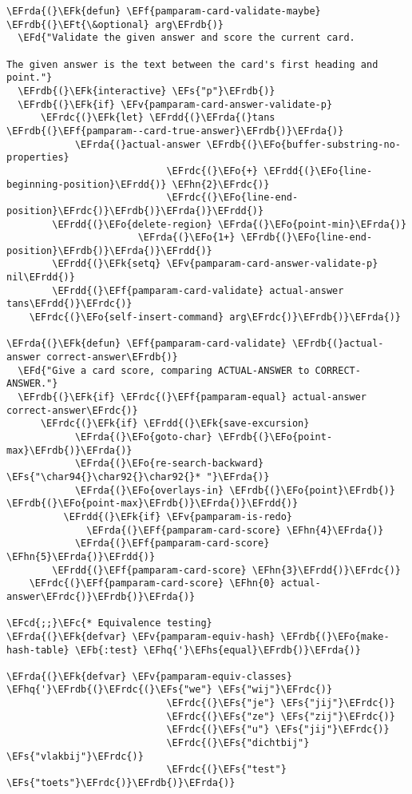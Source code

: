\documentclass[a4wide,10pt]{article}
\newcommand{\EFc}[1]{\textcolor{EFc}{#1}} %
\newcommand{\EFcd}[1]{\textcolor{EFcd}{#1}} %
\newcommand{\EFs}[1]{\textcolor{EFs}{#1}} %
\newcommand{\EFd}[1]{\textcolor{EFd}{#1}} %
\newcommand{\EFk}[1]{\textcolor{EFk}{#1}} %
\newcommand{\EFb}[1]{\textcolor{EFb}{#1}} %
\newcommand{\EFf}[1]{\textcolor{EFf}{#1}} %
\newcommand{\EFv}[1]{\textcolor{EFv}{#1}} %
\newcommand{\EFt}[1]{\textcolor{EFt}{#1}} %
\newcommand{\EFo}[1]{\textcolor{EFo}{#1}} %
\newcommand{\EFhn}[1]{\textcolor{EFhn}{\textbf{#1}}} %
\newcommand{\EFhq}[1]{\textcolor{EFhq}{#1}} %
\newcommand{\EFhs}[1]{\textcolor{EFhs}{#1}} %
\newcommand{\EFrda}[1]{\textcolor{EFrda}{#1}} %
\newcommand{\EFrdb}[1]{\textcolor{EFrdb}{#1}} %
\newcommand{\EFrdc}[1]{\textcolor{EFrdc}{#1}} %
\newcommand{\EFrdd}[1]{\textcolor{EFrdd}{#1}} %
\begin{document}
\begin{Code}
\begin{Verbatim}
\EFrda{(}\EFk{defun} \EFf{pamparam-card-validate-maybe} \EFrdb{(}\EFt{\&optional} arg\EFrdb{)}
  \EFd{"Validate the given answer and score the current card.

The given answer is the text between the card's first heading and
point."}
  \EFrdb{(}\EFk{interactive} \EFs{"p"}\EFrdb{)}
  \EFrdb{(}\EFk{if} \EFv{pamparam-card-answer-validate-p}
      \EFrdc{(}\EFk{let} \EFrdd{(}\EFrda{(}tans \EFrdb{(}\EFf{pamparam--card-true-answer}\EFrdb{)}\EFrda{)}
            \EFrda{(}actual-answer \EFrdb{(}\EFo{buffer-substring-no-properties}
                            \EFrdc{(}\EFo{+} \EFrdd{(}\EFo{line-beginning-position}\EFrdd{)} \EFhn{2}\EFrdc{)}
                            \EFrdc{(}\EFo{line-end-position}\EFrdc{)}\EFrdb{)}\EFrda{)}\EFrdd{)}
        \EFrdd{(}\EFo{delete-region} \EFrda{(}\EFo{point-min}\EFrda{)}
                       \EFrda{(}\EFo{1+} \EFrdb{(}\EFo{line-end-position}\EFrdb{)}\EFrda{)}\EFrdd{)}
        \EFrdd{(}\EFk{setq} \EFv{pamparam-card-answer-validate-p} nil\EFrdd{)}
        \EFrdd{(}\EFf{pamparam-card-validate} actual-answer tans\EFrdd{)}\EFrdc{)}
    \EFrdc{(}\EFo{self-insert-command} arg\EFrdc{)}\EFrdb{)}\EFrda{)}

\EFrda{(}\EFk{defun} \EFf{pamparam-card-validate} \EFrdb{(}actual-answer correct-answer\EFrdb{)}
  \EFd{"Give a card score, comparing ACTUAL-ANSWER to CORRECT-ANSWER."}
  \EFrdb{(}\EFk{if} \EFrdc{(}\EFf{pamparam-equal} actual-answer correct-answer\EFrdc{)}
      \EFrdc{(}\EFk{if} \EFrdd{(}\EFk{save-excursion}
            \EFrda{(}\EFo{goto-char} \EFrdb{(}\EFo{point-max}\EFrdb{)}\EFrda{)}
            \EFrda{(}\EFo{re-search-backward} \EFs{"\char94{}\char92{}\char92{}* "}\EFrda{)}
            \EFrda{(}\EFo{overlays-in} \EFrdb{(}\EFo{point}\EFrdb{)} \EFrdb{(}\EFo{point-max}\EFrdb{)}\EFrda{)}\EFrdd{)}
          \EFrdd{(}\EFk{if} \EFv{pamparam-is-redo}
              \EFrda{(}\EFf{pamparam-card-score} \EFhn{4}\EFrda{)}
            \EFrda{(}\EFf{pamparam-card-score} \EFhn{5}\EFrda{)}\EFrdd{)}
        \EFrdd{(}\EFf{pamparam-card-score} \EFhn{3}\EFrdd{)}\EFrdc{)}
    \EFrdc{(}\EFf{pamparam-card-score} \EFhn{0} actual-answer\EFrdc{)}\EFrdb{)}\EFrda{)}

\EFcd{;;}\EFc{* Equivalence testing}
\EFrda{(}\EFk{defvar} \EFv{pamparam-equiv-hash} \EFrdb{(}\EFo{make-hash-table} \EFb{:test} \EFhq{'}\EFhs{equal}\EFrdb{)}\EFrda{)}

\EFrda{(}\EFk{defvar} \EFv{pamparam-equiv-classes} \EFhq{'}\EFrdb{(}\EFrdc{(}\EFs{"we"} \EFs{"wij"}\EFrdc{)}
                            \EFrdc{(}\EFs{"je"} \EFs{"jij"}\EFrdc{)}
                            \EFrdc{(}\EFs{"ze"} \EFs{"zij"}\EFrdc{)}
                            \EFrdc{(}\EFs{"u"} \EFs{"jij"}\EFrdc{)}
                            \EFrdc{(}\EFs{"dichtbij"} \EFs{"vlakbij"}\EFrdc{)}
                            \EFrdc{(}\EFs{"test"} \EFs{"toets"}\EFrdc{)}\EFrdb{)}\EFrda{)}


\end{Verbatim}
\end{Code}
\end{document}
